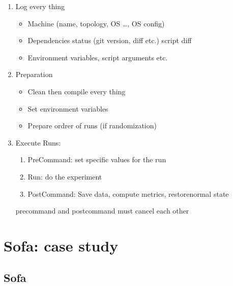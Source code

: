 \begin{itemize}
\begin{itemize}
\begin{enumerate}
                    \item Log every thing
                        \begin{itemize}
                            \item Machine (name, topology, OS \ldots, OS
                                config)
                            \item Dependencies status (git version, diff etc.)
                                script diff
                            \item Environment variables, script arguments etc.
                        \end{itemize}
                    \item Preparation
                        \begin{itemize}
                            \item Clean then compile every thing
                            \item Set environment variables
                            \item Prepare ordrer of runs (if randomization)
                        \end{itemize}
                    \item Execute Runs:
                        \begin{enumerate}
                            \item PreCommand: set specific values for the run
                            \item Run: do the experiment
                            \item PostCommand: Save data, compute metrics,
                                restorenormal state
                        \end{enumerate}
                        precommand and postcommand must cancel each other
                \end{enumerate}
        \end{itemize}
\end{itemize}


\section{Sofa: case study}

\subsection{Sofa}

